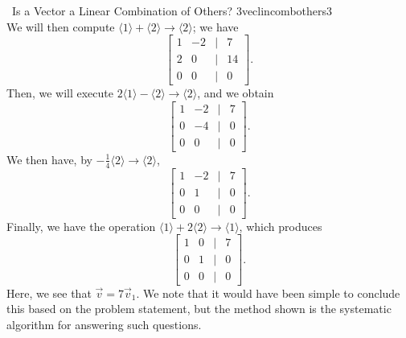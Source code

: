 \begin{example}{\Difficulty\,\Difficulty\,\,Is a Vector a Linear Combination of Others? 3}{veclincombothers3}
\begin{equation*}
            \end{equation*}
            We will then compute \(\langle1\rangle+\langle2\rangle\to\langle2\rangle\); we have
            \begin{equation*}
                \begin{bmatrix}
                    1 & -2 & | & 7 \\
                    2 & 0 & | & 14 \\
                    0 & 0 & | & 0
                \end{bmatrix}.
            \end{equation*}
            Then, we will execute \(2\langle1\rangle-\langle2\rangle\to\langle2\rangle\), and we obtain
            \begin{equation*}
                \begin{bmatrix}
                    1 & -2 & | & 7 \\
                    0 & -4 & | & 0 \\
                    0 & 0 & | & 0
                \end{bmatrix}.
            \end{equation*}
            We then have, by \(-\frac{1}{4}\langle2\rangle\to\langle2\rangle\),
            \begin{equation*}
                \begin{bmatrix}
                    1 & -2 & | & 7 \\
                    0 & 1 & | & 0 \\
                    0 & 0 & | & 0
                \end{bmatrix}.
            \end{equation*}
            Finally, we have the operation \(\langle1\rangle+2\langle2\rangle\to\langle1\rangle\), which produces
            \begin{equation*}
                \begin{bmatrix}
                    1 & 0 & | & 7 \\
                    0 & 1 & | & 0 \\
                    0 & 0 & | & 0
                \end{bmatrix}.
            \end{equation*}
            Here, we see that \(\vec{v}=7\vec{v}_1\). We note that it would have been simple to conclude this based on the problem statement, but the method shown is the systematic algorithm for answering such questions.
            
        \end{example}
